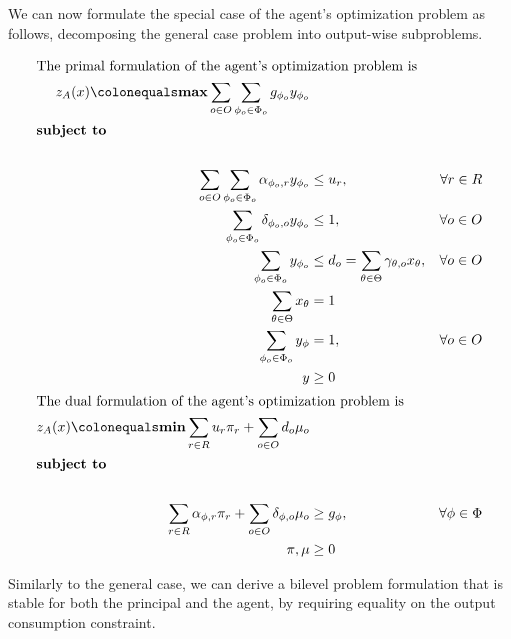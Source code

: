 We can now formulate the special case of the agent's optimization problem as follows, decomposing the general case problem into output-wise subproblems.

\begin{align} 
  \intertext{The primal formulation of the agent's optimization problem is}
    z_A(x) \colonequals \boldsymbol{\max} \sum_{o \in O} \sum_{\phi_o \in \Phi_o} g_{\phi_o} y_{\phi_o} \\
    \shortintertext{\textbf{subject to} \nonumber} \\
    \sum_{o \in O} \sum_{\phi_o \in \Phi_o} \alpha_{\phi_o,r} y_{\phi_o} & \leq u_r , & \forall r \in R \\
    \sum_{\phi_o \in \Phi_o} \delta_{\phi_o,o} y_{\phi_o} & \leq 1 , & \forall o \in O \\
    \sum_{\phi_o \in \Phi_o} y_{\phi_o} & \leq d_o = \sum_{\theta \in \Theta} \gamma_{\theta,o} x_{\theta} , & \forall o \in O \\
    \sum_{\theta \in \Theta} x_\theta & = 1 \\
    \sum_{\phi_o \in \Phi_o} y_\phi & = 1, & \forall o \in O\\
    y & \geq 0\\
    \intertext{The dual formulation of the agent's optimization problem is}
   z_A(x) \colonequals \boldsymbol{\min} \sum_{r \in R} u_r \pi_r + \sum_{o \in O} d_o \mu_o \\
    \shortintertext{\textbf{subject to} \nonumber} \\
    \sum_{r \in R} \alpha_{\phi,r} \pi_r + \sum_{o \in O} \delta_{\phi,o} \mu_o & \geq  g_{\phi} , & \forall \phi \in \Phi \\
    \pi, \mu & \geq 0 
\end{align}

Similarly to the general case, we can derive a bilevel problem formulation that is stable for both the principal and the agent, by requiring equality on the output consumption constraint.

